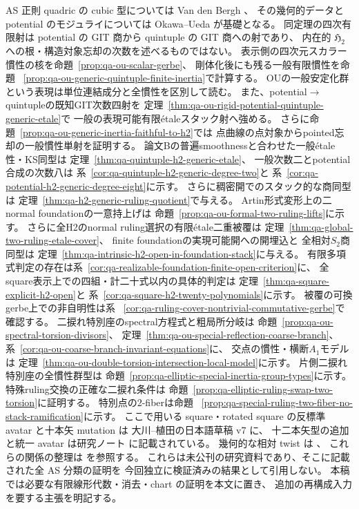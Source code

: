 \documentclass[a4paper,11pt]{ltjsarticle}
\numberwithin{equation}{section}
\theoremstyle{plain}
\theoremstyle{definition}
\theoremstyle{remark}
\newcommand{\HHstack}{\mathfrak H_2}
\begin{document}
AS 正則 quadric の cubic 型については Van den Bergh \cite{VdB2011}、
その幾何的データと potential のモジュライについては
Okawa--Ueda \cite[Theorem 1.1]{OU2014} が基礎となる。
同定理の四次有限射は potential の GIT 商から quintuple の GIT 商への射であり、
内在的 $\HHstack$ への根・構造対象忘却の次数を述べるものではない。
表示側の四次元スカラー慣性の核を命題~\ref{prop:qa-ou-scalar-gerbe}、
剛体化後にも残る一般有限慣性を命題
~\ref{prop:qa-ou-generic-quintuple-finite-inertia}で計算する。
OUの一般安定化群という表現は単位連結成分と全慣性を区別して読む。
また、potential$\to$quintupleの既知GIT次数四射を
定理~\ref{thm:qa-ou-rigid-potential-quintuple-generic-etale}で
一般の表現可能有限étaleスタック射へ強める。
さらに命題~\ref{prop:qa-ou-generic-inertia-faithful-to-h2}では
点曲線の点対象からpointed忘却の一般慣性単射を証明する。
論文Bの普遍smoothnessと合わせた一般étale性・KS同型は
定理~\ref{thm:qa-quintuple-h2-generic-etale}、
一般次数二とpotential合成の次数八は
系~\ref{cor:qa-quintuple-h2-generic-degree-two}と
系~\ref{cor:qa-potential-h2-generic-degree-eight}に示す。
さらに稠密開でのスタック的な商同型は
定理~\ref{thm:qa-h2-generic-ruling-quotient}で与える。
Artin形式変形上の二normal foundationの一意持上げは
命題~\ref{prop:qa-ou-formal-two-ruling-lifts}に示す。
さらに全H2のnormal ruling選択の有限étale二重被覆は
定理~\ref{thm:qa-global-two-ruling-etale-cover}、
finite foundationの実現可能開への開埋込と
全相対$S_2$商同型は
定理~\ref{thm:qa-intrinsic-h2-open-in-foundation-stack}に与える。
有限多項式判定の存在は系~\ref{cor:qa-realizable-foundation-finite-open-criterion}に、
全square表示上での四組・計二十式以内の具体的判定は
定理~\ref{thm:qa-square-explicit-h2-open}と
系~\ref{cor:qa-square-h2-twenty-polynomials}に示す。
被覆の可換gerbe上での非自明性は系
~\ref{cor:qa-ruling-cover-nontrivial-commutative-gerbe}で確認する。
二捩れ特別座のspectral方程式と粗局所分岐は
命題~\ref{prop:qa-ou-spectral-torsion-divisors}、
定理~\ref{thm:qa-ou-special-reflection-coarse-branch}、
系~\ref{cor:qa-ou-coarse-branch-invariant-equations}に、
交点の慣性・横断$A_1$モデルは
定理~\ref{thm:qa-ou-double-torsion-intersection-local-model}に示す。
片側二捩れ特別座の全慣性群型は
命題~\ref{prop:qa-elliptic-special-inertia-group-types}に示す。
特殊ruling交換の正確な二捩れ条件は
命題~\ref{prop:qa-elliptic-ruling-swap-two-torsion}に証明する。
特別点の2-fiberは命題
~\ref{prop:qa-special-ruling-two-fiber-no-stack-ramification}に示す。
ここで用いる square・rotated square の反標準 avatar と十本矢 mutation は
大川--植田の日本語草稿 v7 \cite{AvatarVSeven2026} に、
十二本矢型の追加と統一 avatar は研究ノート \cite{Q12Avatar2026} に記載されている。
幾何的な相対 twist は \cite{Q12Weyl2026}、
これらの関係の整理は \cite{Synthesis2026} を参照する。
これらは未公刊の研究資料であり、そこに記載された全 AS 分類の証明を
今回独立に検証済みの結果として引用しない。
本稿では必要な有限線形代数・消去・chart の証明を本文に置き、
追加の再構成入力を要する主張を明記する。
\end{document}

